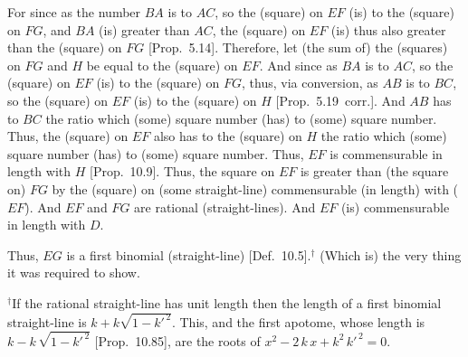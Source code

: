 \begin{Parallel}{}{}
{
\centerline{}

For since as the number $BA$ is to $AC$, so the (square) on $EF$ (is)
to the (square) on $FG$, and $BA$ (is) greater than $AC$, the
(square) on $EF$ (is) thus also greater than the (square) on $FG$ [Prop.~5.14]. Therefore, let (the sum of) the (squares)
on $FG$ and $H$ be equal to the (square) on $EF$. And since as $BA$
is to $AC$, so the (square) on $EF$ (is) to the (square) on $FG$, thus,
via conversion, as $AB$ is to $BC$, so the (square) on $EF$ (is) to
the (square) on $H$ [Prop.~5.19~corr.]. 
And $AB$ has to $BC$ the ratio which (some) square number (has) to
(some) square number. Thus, the (square) on $EF$ also has to
the (square) on $H$ the ratio which (some) square number (has) to
(some) square number. Thus,
$EF$ is commensurable in length with $H$  [Prop.~10.9]. Thus, the square on $EF$
is greater than (the square on) $FG$ by the (square) on (some straight-line)
commensurable (in length) with ($EF$). And $EF$ and $FG$ are rational (straight-lines). And $EF$ (is) commensurable in length with $D$.

Thus, $EG$ is a first binomial (straight-line) [Def.~10.5].$^\dag$
(Which is) the very thing it was required to show.}
\end{Parallel}
{\footnotesize\noindent $^\dag$If the rational straight-line has unit length then the length of a first binomial straight-line
is  $k+k\sqrt{1-k'^{\,2}}$. This, and the first apotome,
whose length is $k-k\,\sqrt{1-k'^{\,2}}$ [Prop.~10.85],
are the roots of $x^2- 2\,k\,x+k^2\,k'^{\,2}=0$.}  \\~\\

